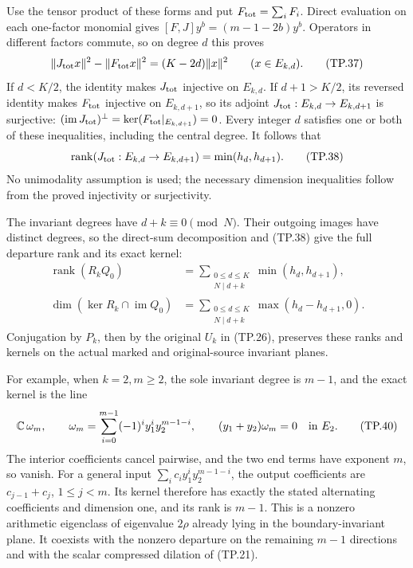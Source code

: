 Use the tensor product of these forms and put
\(F_{\rm tot}=\sum_iF_i\). Direct evaluation on each
one-factor monomial gives \([F,J]y^b=(m-1-2b)y^b\).
Operators in different factors commute, so on degree
\(d\) this proves
\[
 \|J_{\rm tot}x\|^2-\|F_{\rm tot}x\|^2
       =(K-2d)\|x\|^2\qquad(x\in E_{k,d}).
 \tag{TP.37}\label{eq:tp-rankidentity}
\]
If \(d<K/2\), the identity makes \(J_{\rm tot}\)
injective on \(E_{k,d}\). If \(d+1>K/2\), its reversed
identity makes \(F_{\rm tot}\) injective on
\(E_{k,d+1}\), so its adjoint
\(J_{\rm tot}:E_{k,d}\to E_{k,d+1}\) is surjective:
\((\operatorname{im}J_{\rm tot})^\perp
  =\ker(F_{\rm tot}|_{E_{k,d+1}})=0\).
Every integer \(d\) satisfies
one or both of these inequalities, including the
central degree. It follows that
\[
 \operatorname{rank}(J_{\rm tot}:E_{k,d}\to E_{k,d+1})
         =\min(h_d,h_{d+1}).
 \tag{TP.38}\label{eq:tp-rank}
\]
No unimodality assumption is used; the necessary
dimension inequalities follow from the proved
injectivity or surjectivity.

The invariant degrees have \(d+k\equiv0\pmod N\).
Their outgoing images have distinct degrees, so the
direct-sum decomposition and (TP.38) give the full
departure rank and its exact kernel:
\[
 \begin{split}
 \operatorname{rank}(R_kQ_0)
    &=\sum_{\substack{0\leq d\leq K\\N\mid d+k}}
                      \min(h_d,h_{d+1}),\\
 \dim(\ker R_k\cap\operatorname{im}Q_0)
    &=\sum_{\substack{0\leq d\leq K\\N\mid d+k}}
                      \max(h_d-h_{d+1},0).
 \end{split}
 \tag{TP.39}\label{eq:tp-leakagerank}
\]
Conjugation by \(P_k\), then by the original \(U_k\)
in (TP.26), preserves these ranks and kernels on the
actual marked and original-source invariant planes.

For example, when \(k=2,m\geq2\), the sole invariant
degree is \(m-1\), and the exact kernel is the line
\[
 \mathbb C\,\omega_m,\qquad
 \omega_m=\sum_{i=0}^{m-1}(-1)^i y_1^i y_2^{m-1-i},
 \qquad (y_1+y_2)\omega_m=0\quad\hbox{in }E_2.
 \tag{TP.40}\label{eq:tp-twofactor}
\]
The interior coefficients cancel pairwise, and the two
end terms have exponent \(m\), so vanish. For a general
input \(\sum_i c_i y_1^i y_2^{m-1-i}\), the output
coefficients are \(c_{j-1}+c_j\), \(1\leq j<m\).
Its kernel therefore has exactly the stated alternating
coefficients and dimension one, and its rank is \(m-1\).
This is a nonzero arithmetic eigenclass of eigenvalue
\(2\rho\) already lying in the boundary-invariant plane.
It coexists with the nonzero departure on the remaining
\(m-1\) directions and with the scalar compressed
dilation of (TP.21).

